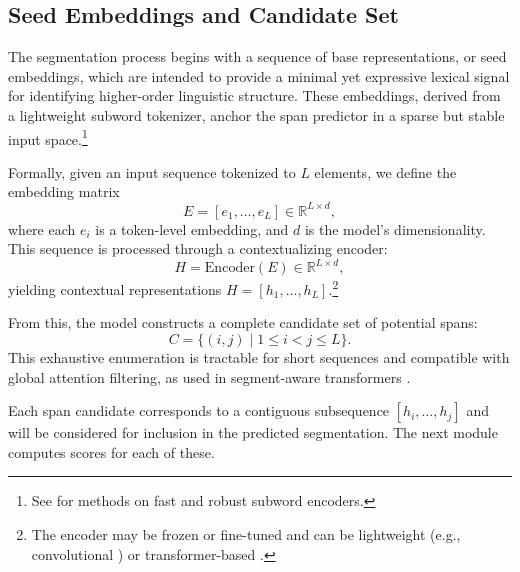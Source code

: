 \subsection{Seed Embeddings and Candidate Set}

The segmentation process begins with a sequence of base representations, or seed embeddings, which are intended to provide a minimal yet expressive lexical signal for identifying higher-order linguistic structure. These embeddings, derived from a lightweight subword tokenizer, anchor the span predictor in a sparse but stable input space.\footnote{See \cite{kudo2018sentencepiece, sennrich2016bpe, tay2021charformer} for methods on fast and robust subword encoders.}

Formally, given an input sequence tokenized to \(L\) elements, we define the embedding matrix
\[
E = [e_1, \dots, e_L] \in \mathbb{R}^{L \times d},
\]
where each \(e_i\) is a token-level embedding, and \(d\) is the model’s dimensionality. This sequence is processed through a contextualizing encoder:
\[
H = \mathrm{Encoder}(E) \in \mathbb{R}^{L \times d},
\]
yielding contextual representations \(H = [h_1, \dots, h_L]\).\footnote{The encoder may be frozen or fine-tuned and can be lightweight (e.g., convolutional \cite{tay2021charformer}) or transformer-based \cite{devlin2019bert, raffel2020t5}.}

From this, the model constructs a complete candidate set of potential spans:
\[
C = \{(i,j) \mid 1 \le i < j \le L\}.
\]
This exhaustive enumeration is tractable for short sequences and compatible with global attention filtering, as used in segment-aware transformers \cite{joshi2020spanbert, zach2019segmenter, cao2021codegen}.

Each span candidate corresponds to a contiguous subsequence \([h_i, \dots, h_j]\) and will be considered for inclusion in the predicted segmentation. The next module computes scores for each of these.